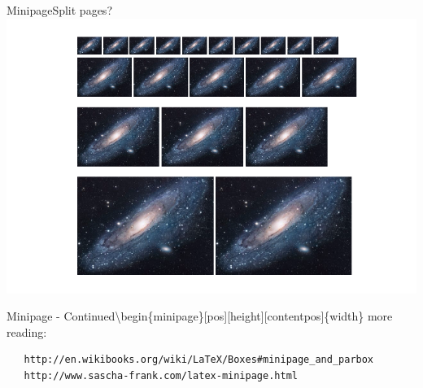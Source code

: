\begin{frame}{Minipage}{Split pages?}
    \includegraphics[width=\textwidth]{img/2-minipage.png}
\end{frame}

\begin{frame}[fragile]{Minipage - Continued}{\textbackslash begin\{minipage\}[pos][height][contentpos]\{width\}}
   more reading:
   \begin{lstlisting}
   http://en.wikibooks.org/wiki/LaTeX/Boxes#minipage_and_parbox
   http://www.sascha-frank.com/latex-minipage.html
   \end{lstlisting}
\end{frame}